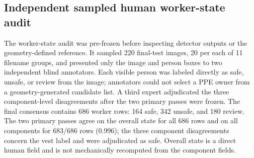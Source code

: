 \documentclass[iicol,pdflatex,sn-mathphys-num]{sn-jnl}
\begin{document}
\begin{table}[t]
\caption{Open-candidate, source-stratified random human ownership audit. The 66 pre-frozen images contain 334 PPE boxes from all 11 filename groups. Conditional exact scoring excludes 13 three-pass \texttt{AMBIGUOUS} rows, leaving 321 determinate owner rows. ``All-row lower'' instead counts each ambiguous row as a non-match; it is conservative sensitivity, not a known-error estimate. Exact requires equality of the predicted and blind-majority human owner sets. Brackets are descriptive filename-group resampling intervals, not cluster-valid confidence intervals.}
\label{tab:randomaudit}
\centering
\scriptsize
\setlength{\tabcolsep}{4pt}
\end{table}

\subsection{Independent sampled human worker-state audit}\label{sec:humanstateaudit}
The worker-state audit was pre-frozen before inspecting detector outputs or the geometry-defined reference. It sampled 220 final-test images, 20 per each of 11 filename groups, and presented only the image and person boxes to two independent blind annotators. Each visible person was labeled directly as safe, unsafe, or review from the image; annotators could not select a PPE owner from a geometry-generated candidate list. A third expert adjudicated the three component-level disagreements after the two primary passes were frozen. The final consensus contains 686 worker rows: 164 safe, 342 unsafe, and 180 review. The two primary passes agree on the overall state for all 686 rows and on all components for 683/686 rows (0.996); the three component disagreements concern the vest label and were adjudicated as safe. Overall state is a direct human field and is not mechanically recomputed from the component fields.
\end{document}
